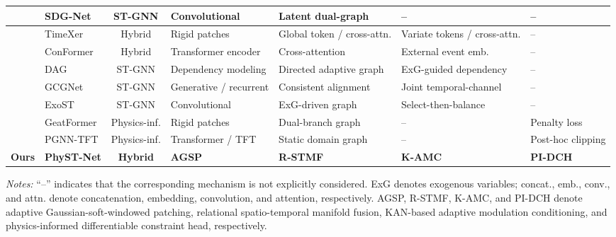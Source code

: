 \begin{table}[!t]
\begin{tabularx}{\textwidth}{l l c Y Y Y Y}
& SDG-Net \cite{li2024sdg} 
& ST-GNN 
& Convolutional 
& Latent dual-graph 
& -- 
& -- \\

\midrule

& TimeXer \cite{wang2024timexer} 
& Hybrid 
& Rigid patches 
& Global token / cross-attn. 
& Variate tokens / cross-attn. 
& -- \\

& ConFormer \cite{conformer2025} 
& Hybrid 
& Transformer encoder 
& Cross-attention 
& External event emb. 
& -- \\

& DAG \cite{dag2025} 
& ST-GNN 
& Dependency modeling 
& Directed adaptive graph 
& ExG-guided dependency 
& -- \\

& GCGNet \cite{gcgnet2026} 
& ST-GNN 
& Generative / recurrent 
& Consistent alignment 
& Joint temporal-channel 
& -- \\

& ExoST \cite{exost2025} 
& ST-GNN 
& Convolutional 
& ExG-driven graph 
& Select-then-balance 
& -- \\

\midrule

& GeatFormer \cite{liu2026geatformer} 
& Physics-inf. 
& Rigid patches 
& Dual-branch graph 
& -- 
& Penalty loss \\

& PGNN-TFT \cite{PGNNTFT2025} 
& Physics-inf. 
& Transformer / TFT 
& Static domain graph 
& -- 
& Post-hoc clipping \\

\midrule

\textbf{Ours} 
& \textbf{PhyST-Net} 
& \textbf{Hybrid} 
& \textbf{AGSP} 
& \textbf{R-STMF} 
& \textbf{K-AMC} 
& \textbf{PI-DCH} \\

\bottomrule
\end{tabularx}

\vspace{2pt}
\begin{minipage}{\textwidth}
\scriptsize
\textit{Notes:} ``--'' indicates that the corresponding mechanism is not explicitly considered. 
ExG denotes exogenous variables; concat., emb., conv., and attn. denote concatenation, embedding, convolution, and attention, respectively. 
AGSP, R-STMF, K-AMC, and PI-DCH denote adaptive Gaussian-soft-windowed patching, relational spatio-temporal manifold fusion, KAN-based adaptive modulation conditioning, and physics-informed differentiable constraint head, respectively.
\end{minipage}

\end{table}

